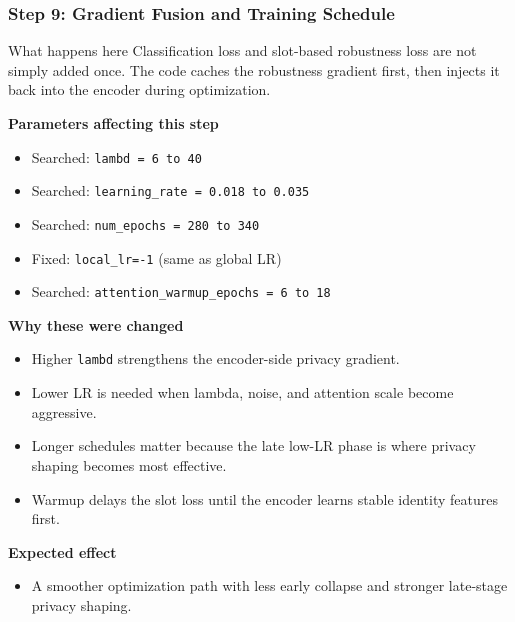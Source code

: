 \documentclass[aspectratio=169]{beamer}
\newcommand{\stepheader}[2]{
    \frametitle{Step #1: #2}
}
\begin{document}
\begin{frame}
    \stepheader{9}{Gradient Fusion and Training Schedule}
    \scriptsize
    \begin{block}{What happens here}
        Classification loss and slot-based robustness loss are not simply added once. The code caches the robustness gradient first, then injects it back into the encoder during optimization.
    \end{block}
    \textbf{Parameters affecting this step}
    \begin{itemize}
        \item Searched: \texttt{lambd = 6 to 40}
        \item Searched: \texttt{learning\_rate = 0.018 to 0.035}
        \item Searched: \texttt{num\_epochs = 280 to 340}
        \item Fixed: \texttt{local\_lr=-1} (same as global LR)
        \item Searched: \texttt{attention\_warmup\_epochs = 6 to 18}
    \end{itemize}
    \textbf{Why these were changed}
    \begin{itemize}
        \item Higher \texttt{lambd} strengthens the encoder-side privacy gradient.
        \item Lower LR is needed when lambda, noise, and attention scale become aggressive.
        \item Longer schedules matter because the late low-LR phase is where privacy shaping becomes most effective.
        \item Warmup delays the slot loss until the encoder learns stable identity features first.
    \end{itemize}
    \textbf{Expected effect}
    \begin{itemize}
        \item A smoother optimization path with less early collapse and stronger late-stage privacy shaping.
    \end{itemize}
\end{frame}
\end{document}
